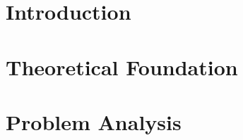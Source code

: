 \documentclass[12pt]{report}
\begin{document}
\tableofcontents

\chapter{Introduction}





\chapter{Theoretical Foundation}\label{chap:2}



\chapter{Problem Analysis}

% 




\printbibliography
\end{document}
